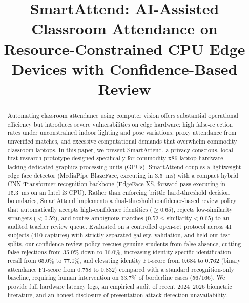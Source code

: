 \documentclass[conference]{IEEEtran}
\begin{document}
\title{SmartAttend: AI-Assisted Classroom Attendance on Resource-Constrained CPU Edge Devices with Confidence-Based Review}

\author{
}

\maketitle

\begin{abstract}
Automating classroom attendance using computer vision offers substantial operational efficiency but introduces severe vulnerabilities on edge hardware: high false-rejection rates under unconstrained indoor lighting and pose variations, proxy attendance from unverified matches, and excessive computational demands that overwhelm commodity classroom laptops. In this paper, we present SmartAttend, a privacy-conscious, local-first research prototype designed specifically for commodity x86 laptop hardware lacking dedicated graphics processing units (GPUs). SmartAttend couples a lightweight edge face detector (MediaPipe BlazeFace, executing in 3.5~ms) with a compact hybrid CNN-Transformer recognition backbone (EdgeFace XS, forward pass executing in 15.3~ms on an Intel i3 CPU). Rather than enforcing brittle hard-threshold decision boundaries, SmartAttend implements a dual-threshold confidence-based review policy that automatically accepts high-confidence identities ($\ge 0.65$), rejects low-similarity strangers ($< 0.52$), and routes ambiguous matches ($0.52 \le \text{similarity} < 0.65$) to an audited teacher review queue. Evaluated on a controlled open-set protocol across 41 subjects (410 captures) with strictly separated gallery, validation, and held-out test splits, our confidence review policy rescues genuine students from false absence, cutting false rejections from 35.0\% down to 16.0\%, increasing identity-specific identification recall from 65.0\% to 77.0\%, and elevating identity F1-score from 0.684 to 0.762 (binary attendance F1-score from 0.758 to 0.832) compared with a standard recognition-only baseline, requiring human intervention on 33.7\% of borderline cases (56/166). We provide full hardware latency logs, an empirical audit of recent 2024--2026 biometric literature, and an honest disclosure of presentation-attack detection unavailability.
\end{abstract}
\end{document}
